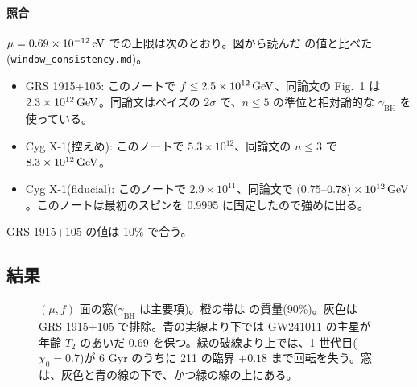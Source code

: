 \paragraph{照合}
$\mu=0.69\times10^{-12}\,\mathrm{eV}$ での上限は次のとおり。図から読んだ  の値と比べた(\texttt{window\_consistency.md})。
\begin{itemize}
\item GRS 1915+105: このノートで $f\le2.5\times10^{12}\,\mathrm{GeV}$、同論文の Fig.~1 は $2.3\times10^{12}\,\mathrm{GeV}$。同論文はベイズの 2$\sigma$ で、$n\le5$ の準位と相対論的な $\gamma_\mathrm{BH}$ を使っている。
\item Cyg X-1(控えめ): このノートで $5.3\times10^{12}$、同論文の $n\le3$ で $8.3\times10^{12}\,\mathrm{GeV}$。
\item Cyg X-1(fiducial): このノートで $2.9\times10^{11}$、同論文で $(0.75$--$0.78)\times10^{12}\,\mathrm{GeV}$。このノートは最初のスピンを 0.9995 に固定したので強めに出る。
\end{itemize}
GRS 1915+105 の値は 10\% で合う。

\subsection{結果}

\begin{figure}[H]
\centering

\caption{$(\mu,f)$ 面の窓($\gamma_\mathrm{BH}$ は主要項)。橙の帯は  の質量(90\%)。灰色は GRS 1915+105 で排除。青の実線より下では GW241011 の主星が年齢 $T_2$ のあいだ 0.69 を保つ。緑の破線より上では、1 世代目($\chi_0=0.7$)が 6 Gyr のうちに 211 の臨界 $+0.18$ まで回転を失う。窓は、灰色と青の線の下で、かつ緑の線の上にある。}
\label{fig:e08}
\end{figure}

